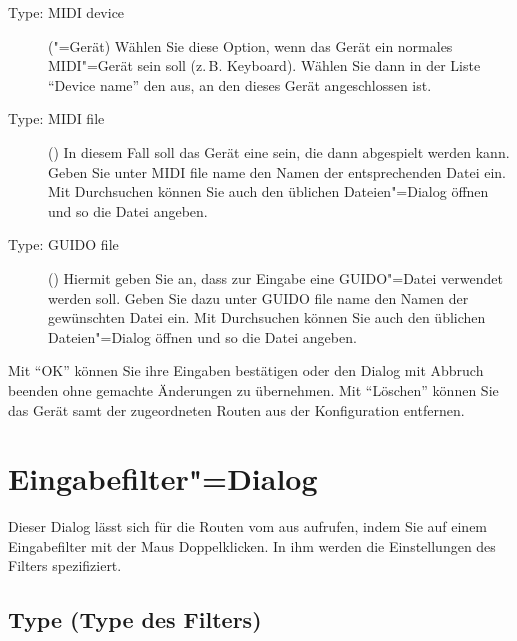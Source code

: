 {\begin{description}
\item[Type: MIDI device] ("=Gerät)
  Wählen Sie diese Option, wenn das Gerät ein normales MIDI"=Gerät
  sein soll (z.\,B. Keyboard). Wählen Sie dann in der Liste "`Device
  name"' den  aus, an den dieses
  Gerät angeschlossen ist.

\item[Type: MIDI file] ()
  In diesem Fall soll das Gerät eine
   sein, die dann abgespielt
  werden kann. Geben Sie unter MIDI file name den Namen der
  entsprechenden Datei ein. Mit Durchsuchen können Sie auch den
  üblichen Dateien"=Dialog öffnen und so die Datei angeben.

\item[Type: GUIDO file] () Hiermit
  geben Sie an, dass zur Eingabe eine GUIDO"=Datei verwendet werden
  soll. Geben Sie dazu unter GUIDO file name den Namen der gewünschten
  Datei ein. Mit Durchsuchen können Sie auch den üblichen
  Dateien"=Dialog öffnen und so die Datei angeben.
\end{description}


Mit "`OK"' können Sie ihre Eingaben bestätigen oder den Dialog mit Abbruch
beenden ohne gemachte Änderungen zu übernehmen.  Mit "`Löschen"'
können Sie das Gerät samt der zugeordneten Routen aus der
Konfiguration entfernen.

\section{Eingabefilter"=Dialog}\label{sec:DE_R1}
Dieser Dialog lässt sich für die Routen vom
 aus aufrufen, indem Sie auf
einem Eingabefilter mit der Maus Doppelklicken. In ihm werden die
Einstellungen des Filters spezifiziert.

\subsection{Type (Type des Filters)}

}

